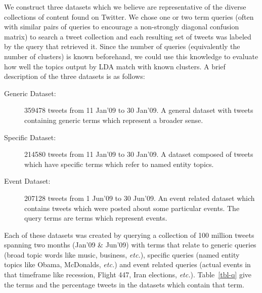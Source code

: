 \documentclass{sig-alternate}
\begin{document}
We construct three datasets which we believe are representative of the
diverse collections of content found on Twitter.  We chose one or
two term queries (often with similar pairs of queries to encourage
a non-strongly diagonal confusion matrix) to search a tweet
collection and each resulting set of tweets was labeled by the query
that retrieved it.  Since the number of queries (equivalently the
number of clusters) is known beforehand, we could use this knowledge
to evaluate how well the topics output by LDA match with known
clusters. A brief description of the three datasets is as
follows:

\begin{description}
\item[Generic Dataset: ]
 359478 tweets from 11 Jan'09 to 30 Jan'09.
A general dataset with tweets containing generic terms which represent a broader sense.\vspace{-5pt}
\item[Specific Dataset: ]
214580 tweets from 11 Jan'09 to 30 Jan'09.
A dataset composed of tweets which have specific terms which refer to named entity topics.\vspace{-5pt}
\item[Event Dataset: ]
207128 tweets from 1 Jun'09 to 30 Jun'09.
An event related dataset which contains tweets which were posted about some particular events. The query terms are terms which represent events.
\end{description}

Each of these datasets was created by querying a collection of 100
million tweets spanning two months (Jan'09 \& Jun'09) with terms
that relate to generic queries (broad topic words like music,
business, {\it etc.}), specific queries (named entity topics like
Obama, McDonalds, {\it etc.}) and event related queries (actual events
in that timeframe like recession, Flight 447, Iran elections, {\it
  etc.}).  Table~\ref{tbl-q} give the terms and the percentage tweets
in the datasets which contain that term.
\end{document}
